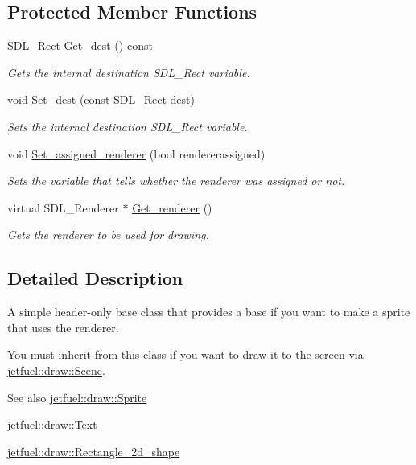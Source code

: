\subsection*{Protected Member Functions}
\begin{DoxyCompactItemize}
\item 
S\+D\+L\+\_\+\+Rect \hyperlink{classjetfuel_1_1draw_1_1Drawable_a8709fde1dc750d3c6ca5ecb8b9b4fb12}{Get\+\_\+dest} () const
\begin{DoxyCompactList}\small\item\em Gets the internal destination S\+D\+L\+\_\+\+Rect variable. \end{DoxyCompactList}\item 
void \hyperlink{classjetfuel_1_1draw_1_1Drawable_a75a4f944021825be72d3d7f3da7e1093}{Set\+\_\+dest} (const S\+D\+L\+\_\+\+Rect dest)
\begin{DoxyCompactList}\small\item\em Sets the internal destination S\+D\+L\+\_\+\+Rect variable. \end{DoxyCompactList}\item 
void \hyperlink{classjetfuel_1_1draw_1_1Drawable_af8ff41fd1f3e2787743f916386ea225c}{Set\+\_\+assigned\+\_\+renderer} (bool rendererassigned)
\begin{DoxyCompactList}\small\item\em Sets the variable that tells whether the renderer was assigned or not. \end{DoxyCompactList}\item 
virtual S\+D\+L\+\_\+\+Renderer $\ast$ \hyperlink{classjetfuel_1_1draw_1_1Drawable_a6bbda81a7fbd33c388039ecaeb53c278}{Get\+\_\+renderer} ()
\begin{DoxyCompactList}\small\item\em Gets the renderer to be used for drawing. \end{DoxyCompactList}\end{DoxyCompactItemize}


\subsection{Detailed Description}
A simple header-\/only base class that provides a base if you want to make a sprite that uses the renderer.

You must inherit from this class if you want to draw it to the screen via \hyperlink{classjetfuel_1_1draw_1_1Scene}{jetfuel\+::draw\+::\+Scene}.

\begin{DoxySeeAlso}{See also}
\hyperlink{classjetfuel_1_1draw_1_1Sprite}{jetfuel\+::draw\+::\+Sprite} 

\hyperlink{classjetfuel_1_1draw_1_1Text}{jetfuel\+::draw\+::\+Text} 

\hyperlink{classjetfuel_1_1draw_1_1Rectangle__2d__shape}{jetfuel\+::draw\+::\+Rectangle\+\_\+2d\+\_\+shape} 
\end{DoxySeeAlso}


